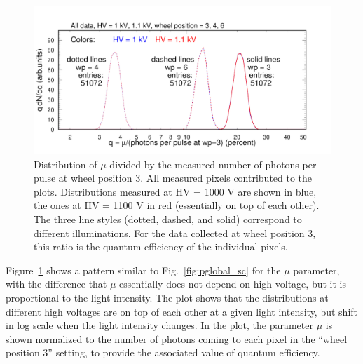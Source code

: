 \begin{figure}[h!]
	\centering
	\includegraphics[width=0.98\linewidth,trim=0 12 50 35,clip]{figures/pglobal_qe_all.pdf}
	\caption{Distribution of $\mu$ divided by the measured number of photons per pulse at wheel position 3. All measured pixels contributed to the plots. Distributions measured at HV = 1000 V are shown in blue, the ones at HV = 1100 V in red (essentially on top of each other). The three line styles (dotted, dashed, and solid) correspond to different illuminations. For the data collected at wheel position 3, this ratio is the quantum efficiency of the individual pixels.}
	\label{fig:pglobal_qe_all}
\end{figure}
Figure~\ref{fig:pglobal_qe_all} shows a pattern similar to Fig.~\ref{fig:pglobal_sc} for the $\mu$ parameter, with the difference that $\mu$ essentially does not depend on high voltage, but it is proportional to the light intensity. The plot shows that the distributions at different high voltages are on top of each other at a given light intensity, but shift in log scale when the light intensity changes. In the plot, the parameter $\mu$ is shown normalized to the number of photons coming to each pixel in the ``wheel position 3'' setting, to provide the associated value of quantum efficiency. 

